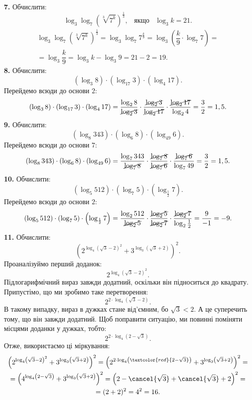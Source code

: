 \textbf{7.} Обчислити:
$$
\log_{3}\log_{7}\left(\sqrt[3]{7^k}\right)^{\frac{1}{3}}, \;\;\; \mbox{якщо} \;\;\; \log_{3}k=21.
$$
\begin{multline*}
\log_{3}\log_{7}\left(\sqrt[3]{7^k}\right)^{\frac{1}{3}}=
\log_{3}\log_{7}7^{\frac{k}{9}}=
\log_{3}\left(\dfrac{k}{9}\cdot\log_{7}7\right)=\\
=\log_{3}\dfrac{k}{9}=
\log_{3}k-\log_{3}9=21-2=19.
\end{multline*}
\textbf{8.} Обчислити:
$$
\left(\log_{3}8\right)\cdot\left(\log_{17}3\right)\cdot\left(\log_{4}17\right).
$$
Перейдемо всюди до основи $2$:
\begin{gather*}
\left(\log_{3}8\right)\cdot\left(\log_{17}3\right)\cdot\left(\log_{4}17\right)=
\dfrac{\log_{2}8}{\cancel{\log_{2}3}}\cdot\dfrac{\cancel{\log_{2}3}}{\cancel{\log_{2}17}}\cdot\dfrac{\cancel{\log_{2}17}}{\log_{2}4}=
\dfrac{3}{2}=1,5.
\end{gather*}
\textbf{9.} Обчислити:
$$
\left(\log_{8}343\right)\cdot\left(\log_{6}8\right)\cdot\left(\log_{49}6\right).
$$
Перейдемо всюди до основи $7$:
\begin{gather*}
\left(\log_{8}343\right)\cdot\left(\log_{6}8\right)\cdot\left(\log_{49}6\right)=
\dfrac{\log_{7}343}{\cancel{\log_{7}8}}\cdot\dfrac{\cancel{\log_{7}8}}{\cancel{\log_{7}6}}\cdot\dfrac{\cancel{\log_{7}6}}{\log_{7}49}=
\dfrac{3}{2}=1,5.
\end{gather*}
\textbf{10.} Обчислити:
$$
\left(\log_{5}512\right)\cdot\left(\log_{7}5\right)\cdot\left(\log_{\frac{1}{2}}7\right).
$$
Перейдемо всюди до основи $2$:
\begin{gather*}
\left(\log_{5}512\right)\cdot\left(\log_{7}5\right)\cdot\left(\log_{\frac{1}{2}}7\right)=
\dfrac{\log_{2}512}{\cancel{\log_{2}5}}\cdot\dfrac{\cancel{\log_{2}5}}{\cancel{\log_{2}7}}\cdot\dfrac{\cancel{\log_{2}7}}{\log_{2}\frac{1}{2}}=
\dfrac{9}{-1}=-9.
\end{gather*}
\textbf{11.} Обчислити:
$$
\left(2^{\log_{4}\left(\sqrt{3}-2\right)^2}+3^{\log_{3}\left(\sqrt{3}+2\right)}\right)^2.
$$
Проаналізуймо перший доданок:
$$
2^{\log_{4}\left(\sqrt{3}-2\right)^2}.
$$
Підлогарифмічний вираз завжди додатний, оскільки він підноситься до квадрату. Припустімо, що ми
зробимо таке перетворення:
$$
2^{2\cdot\log_{4}\left(\sqrt{3}-2\right)}.
$$
В такому випадку, вираз в дужках стане від'ємним, бо $\sqrt{3}<2$. А це суперечить тому, що
він завжди додатний. Щоб поправити ситуацію, ми повинні поміняти місцями доданки у дужках, тобто:
$$
2^{2\cdot\log_{4}\left(2-\sqrt{3}\right)}.
$$
Отже, використаємо ці міркування:
\begin{multline*}
\left(2^{\log_{4}\left(\sqrt{3}-2\right)^2}+3^{\log_{3}\left(\sqrt{3}+2\right)}\right)^2=
\left(2^{2\cdot\log_{4}\left(\textcolor{red}{2-\sqrt{3}}\right)}+3^{\log_{3}\left(\sqrt{3}+2\right)}\right)^2=\\
=\left(4^{\log_{4}\left(2-\sqrt{3}\right)}+3^{\log_{3}\left(\sqrt{3}+2\right)}\right)^2=
\left(2-\cancel{\sqrt{3}}+\cancel{\sqrt{3}}+2\right)^2=\\
=(2+2)^2=4^2=16.
\end{multline*}
